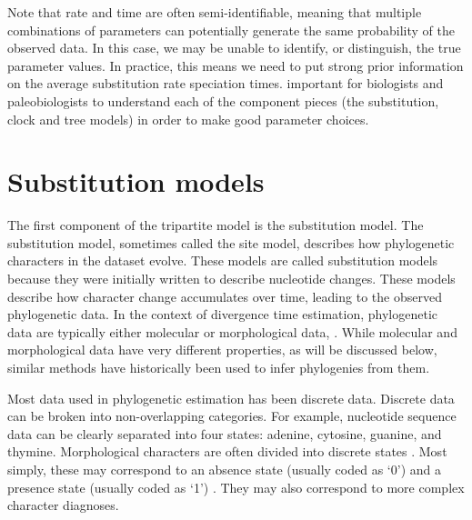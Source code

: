 Note that rate and time are often semi-identifiable, meaning that multiple combinations of parameters can potentially generate the same probability of the observed data.
In this case, we may be unable to identify, or distinguish, the true parameter values.
In practice, this means we need to put strong prior information on the average substitution rate  speciation times. 
 important for biologists and paleobiologists to understand each of the component pieces (the substitution, clock and tree models) in order to make good parameter choices.

\section{Substitution models}

The first component of the tripartite model is the substitution model.
The substitution model, sometimes called the site model, describes how phylogenetic characters in the dataset evolve.
These models are called substitution models because they were initially written to describe nucleotide changes.
These models describe how character change accumulates over time, leading to the observed phylogenetic data.
In the context of divergence time estimation, phylogenetic data are typically either molecular or morphological data, . 
While molecular and morphological data have very different properties, as will be discussed below, similar methods have historically been used to infer phylogenies from them.

Most data used in phylogenetic estimation has been discrete data.
Discrete data can be broken into non-overlapping categories.
For example, nucleotide sequence data can be clearly separated into four states: adenine, cytosine, guanine, and thymine.
Morphological characters are often divided into discrete states \citep{de1985ontogenetic}.
Most simply, these may correspond to an absence state (usually coded as `0') and a presence state (usually coded as `1') \citep{watrous1981}.
They may also correspond to more complex character diagnoses.

